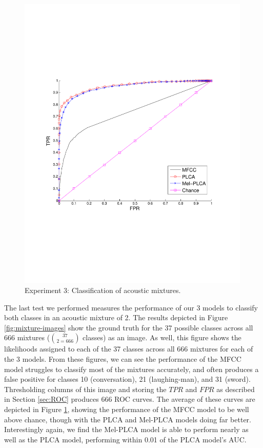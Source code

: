 \documentclass[a4paper,10pt,final]{ThesisStyle}
\begin{document}
\begin{figure}
\centering
\includegraphics[width=0.99\textwidth]{images/mixture-roc-results.pdf}
\caption{Experiment 3: Classification of acoustic mixtures.}
\label{fig:mixture-roc-results}
\end{figure}



The last test we performed measures the performance of our 3 models to classify both classes in an acoustic mixture of 2.  The results depicted in Figure \ref{fig:mixture-images} show the ground truth for the 37 possible classes across all 666 mixtures ($37 \choose 2 = 666$ classes) as an image.  As well, this figure shows the likelihoods assigned to each of the 37 classes across all 666 mixtures for each of the 3 models.  From these figures, we can see the performance of the MFCC model struggles to classify most of the mixtures accurately, and often produces a false positive for classes 10 (conversation), 21 (laughing-man), and 31 (sword).  Thresholding columns of this image and storing the $TPR$ and $FPR$ as described in Section \ref{sec:ROC} produces 666 ROC curves.  The average of these curves are depicted in Figure \ref{fig:mixture-roc-results}, showing the performance of the MFCC model to be well above chance, though with the PLCA and Mel-PLCA models doing far better.  Interestingly again, we find the Mel-PLCA model is able to perform nearly as well as the PLCA model, performing within 0.01 of the PLCA model's AUC.  
\end{document}
